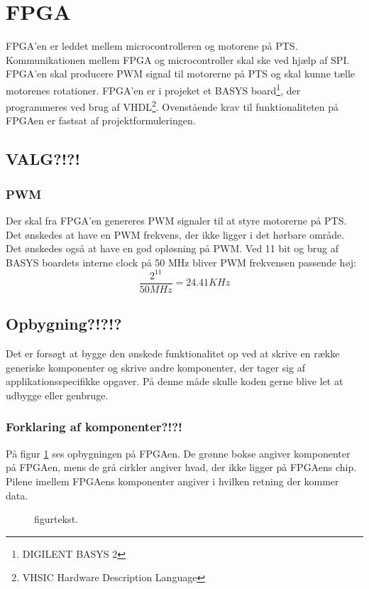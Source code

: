\section{FPGA}
\label{sec:FPGA}

FPGA'en er leddet mellem microcontrolleren og motorene på PTS. 
Kommunikationen mellem FPGA og microcontroller skal ske ved hjælp af SPI. 
FPGA'en skal producere PWM signal til motorerne på PTS og skal kunne tælle motorenes rotationer. 
FPGA'en er i projeket et BASYS board\footnote{DIGILENT BASYS 2}, der programmeres ved brug af VHDL\footnote{VHSIC Hardware Description Language}.
Ovenstående krav til funktionaliteten på FPGAen er fastsat af 
projektformuleringen.


\subsection{VALG?!?!}
\subsubsection*{PWM}
Der skal fra FPGA'en genereres PWM signaler til at styre motorerne på PTS.
Det ønskedes at have en PWM frekvens, der ikke ligger i det hørbare område. 
Det ønskedes også at have en god opløsning på PWM. 
Ved 11 bit og brug af BASYS boardets interne clock på 50 MHz bliver PWM frekvensen passende høj:
\begin{equation}
  \frac{2^{11}}{50 MHz} = 24.41 KHz 
\end{equation}

\subsection{Opbygning?!?!?}
Det er forsøgt at bygge den ønskede funktionalitet op ved at skrive en række generiske komponenter og skrive andre komponenter, der tager sig af applikationsspecifikke opgaver. 
På denne måde skulle koden gerne blive let at udbygge eller genbruge. 
\subsubsection*{Forklaring af komponenter?!?!}
På figur \ref{fig:FPGA_blok} ses opbygningen på FPGAen. De grønne bokse angiver 
komponenter på FPGAen, mens de grå cirkler angiver hvad, der ikke ligger på 
FPGAens chip. Pilene imellem FPGAens komponenter angiver i hvilken retning der 
kommer data.


\begin{figure}[!th]
\centering
\begin{tikzpicture}[node distance = 5 cm,scale=1]

\end{tikzpicture}
\caption[tekst i indholdsfortegnelsen]{figurtekst.}
\label{fig:FPGA_blok}
\end{figure}
